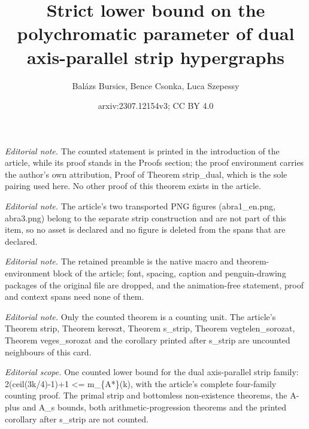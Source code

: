 \documentclass[10pt,a4paper]{amsart}
\title{Strict lower bound on the polychromatic parameter of dual axis-parallel strip hypergraphs}
\author{Balázs Bursics, Bence Csonka, Luca Szepessy}
\date{arxiv:2307.12154v3; CC BY 4.0}
\begin{document}
\maketitle
\noindent\textit{Editorial note.} The counted statement is printed in the introduction of the article, while its proof stands in the Proofs section; the proof environment carries the author's own attribution, Proof of Theorem strip\_dual, which is the sole pairing used here. No other proof of this theorem exists in the article.\par\medskip
\noindent\textit{Editorial note.} The article's two transported PNG figures (abra1\_en.png, abra3.png) belong to the separate strip construction and are not part of this item, so no asset is declared and no figure is deleted from the spans that are declared.\par\medskip
\noindent\textit{Editorial note.} The retained preamble is the native macro and theorem-environment block of the article; font, spacing, caption and penguin-drawing packages of the original file are dropped, and the animation-free statement, proof and context spans need none of them.\par\medskip
\noindent\textit{Editorial note.} Only the counted theorem is a counting unit. The article's Theorem strip, Theorem kereszt, Theorem s\_strip, Theorem vegtelen\_sorozat, Theorem veges\_sorozat and the corollary printed after s\_strip are uncounted neighbours of this card.\par\medskip
\noindent\textit{Editorial scope.} One counted lower bound for the dual axis-parallel strip family: 2(ceil(3k/4)-1)+1 <= m\_\{A*\}(k), with the article's complete four-family counting proof. The primal strip and bottomless non-existence theorems, the A-plus and A\_s bounds, both arithmetic-progression theorems and the printed corollary after s\_strip are not counted.\par\medskip
\end{document}
